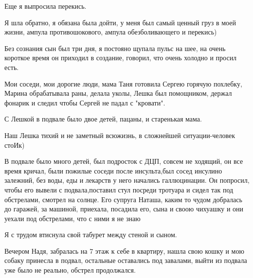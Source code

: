 Еще я выпросила перекись.

Я шла обратно,  я  обязана  была дойти, у меня был самый ценный груз в моей
жизни, ампула противошокового, ампула обезболивающего и перекись)

Без сознания сын был три дня, я постояно  щупала пульс на шее, на очень
короткое время он приходил  в создание, говорил, что очень холодно и просил
есть.

Мои соседи,  мои  дорогие люди, мама Таня готовила Сергею горячую похлебку,
Марина обрабатывала раны, делала уколы,  Лешка был  помощником, держал фонарик
и следил чтобы Сергей не падал с "кровати".

С Лешкой в подвале было двое детей, пацаны, и старенькая мама.

Наш Лешка тихий и не заметный всюжизнь, в сложнейшей ситуации-человек стоИк)

В подвале было много детей, был подросток с ДЦП, совсем не ходящий, он все
время кричал, были пожилые соседи после инсульта,был сосед инсулино залежний,
без воды, еды и лекарств у него начались галлюцинации. Он попросил, чтобы его
вывели с подвала,поставил стул посреди тротуара и  сидел так под обстрелами,
смотрел на солнце. Его супруга Наташа, каким то чудом добралась до гаражей, за
машиной, приехала, посадила его, сына и своою чихуашку и они уехали под
обстрелами, что с ними я не знаю

Я с трудом втиснула свой табурет между стеной и сыном.

Вечером Надя, забралась на 7 этаж к себе в квартиру, нашла свою кошку и мою
собаку принесла в подвал, остальные оставались под завалами, выйти из подвала
уже было не реально, обстрел продолжался.

